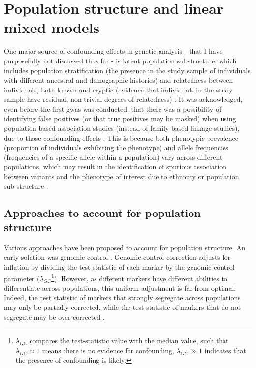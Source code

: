 
\section{Population structure and linear mixed models}
\label{sec:linear_mixed_models}

One major source of confounding effects in genetic analysis - that I have purposefully not discussed thus far -  is latent population substructure, which includes population stratification (the presence in the study sample of individuals with different ancestral and demographic histories) and relatedness between individuals, both known and cryptic (evidence that individuals in the study sample have residual, non-trivial degrees of relatedness) \cite{mccarthy2008genome}.
It was acknowledged, even before the first \gls{gwas} was conducted, that there was a possibility of identifying false positives (or that true positives may be masked) when using population based association studies (instead of family based linkage studies), due to those confounding effects \cite{burton2005key}. 
This is because both phenotypic prevalence (proportion of individuals exhibiting the phenotype) and allele frequencies (frequencies of a specific allele within a population) vary across different populations, which may result in the identification of spurious association between variants and the phenotype of interest due to ethnicity or population sub-structure \cite{burton2005key}.


\subsection{Approaches to account for population structure}
\label{sec:pop_struct_noLMM}

Various approaches have been proposed to account for population structure.
An early solution was genomic control \cite{devlin1999genomic}.
Genomic control correction adjusts for inflation by dividing the test statistic of each marker by the genomic control parameter ($\lambda_{GC}$\footnote{$\lambda_{GC}$ compares the test-statistic value with the median value, such that $\lambda_{GC} \approx 1$ means there is no evidence for confounding, $\lambda_{GC} \gg 1$ indicates that the presence of confounding is likely.}). 
However, as different markers have different abilities to differentiate across populations, this uniform adjustment is far from optimal. 
Indeed, the test statistic of markers that strongly segregate across populations may only be partially corrected, while the test statistic of markers that do not segregate may be over-corrected \cite{marchini2004effects, price2006principal}.

